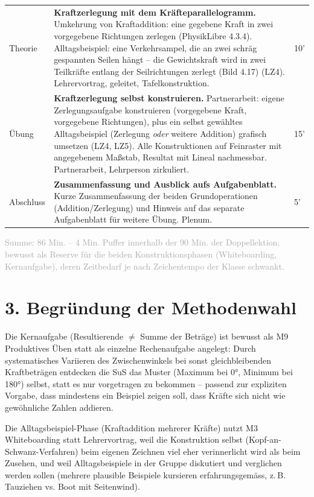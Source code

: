 \documentclass[11pt,a4paper]{article}
\begin{document}
\begin{xltabular}{\textwidth}{@{}p{2.6cm}X p{1.2cm}@{}}
Theorie &
\textbf{Kraftzerlegung mit dem Kräfteparallelogramm.} Umkehrung von
Kraftaddition: eine gegebene Kraft in zwei vorgegebene Richtungen
zerlegen (PhysikLibre 4.3.4). Alltagsbeispiel: eine Verkehrsampel, die an
zwei schräg gespannten Seilen hängt -- die Gewichtskraft wird in zwei
Teilkräfte entlang der Seilrichtungen zerlegt (Bild 4.17) (LZ4).
Lehrervortrag, geleitet, Tafelkonstruktion. &
10' \\[0.4em]

Übung &
\textbf{Kraftzerlegung selbst konstruieren.} Partnerarbeit: eigene
Zerlegungsaufgabe konstruieren (vorgegebene Kraft, vorgegebene Richtungen),
plus ein selbst gewähltes Alltagsbeispiel (Zerlegung \emph{oder} weitere
Addition) grafisch umsetzen (LZ4, LZ5). Alle Konstruktionen auf Feinraster
mit angegebenem Maßstab, Resultat mit Lineal nachmessbar. Partnerarbeit,
Lehrperson zirkuliert. &
15' \\[0.4em]

Abschluss &
\textbf{Zusammenfassung und Ausblick aufs Aufgabenblatt.} Kurze
Zusammenfassung der beiden Grundoperationen (Addition/Zerlegung) und
Hinweis auf das separate Aufgabenblatt für weitere Übung. Plenum. &
5' \\

\bottomrule
\end{xltabular}

\textcolor{darkgray}{\small Summe: 86 Min. -- 4 Min. Puffer innerhalb der
90 Min. der Doppellektion, bewusst als Reserve für die beiden
Konstruktionsphasen (Whiteboarding, Kernaufgabe), deren Zeitbedarf je nach
Zeichentempo der Klasse schwankt.}

\section*{3. Begründung der Methodenwahl}

Die Kernaufgabe (Resultierende $\neq$ Summe der Beträge) ist bewusst als
M9 Produktives Üben statt als einzelne Rechenaufgabe angelegt: Durch
systematisches Variieren des Zwischenwinkels bei sonst gleichbleibenden
Kraftbeträgen entdecken die SuS das Muster (Maximum bei 0°, Minimum bei
180°) selbst, statt es nur vorgetragen zu bekommen -- passend zur
expliziten Vorgabe, dass mindestens ein Beispiel zeigen soll, dass Kräfte
sich nicht wie gewöhnliche Zahlen addieren.

Die Alltagsbeispiel-Phase (Kraftaddition mehrerer Kräfte) nutzt M3
Whiteboarding statt Lehrervortrag, weil die Konstruktion selbst
(Kopf-an-Schwanz-Verfahren) beim eigenen Zeichnen viel eher verinnerlicht
wird als beim Zusehen, und weil Alltagsbeispiele in der Gruppe
diskutiert und verglichen werden sollen (mehrere plausible Beispiele
kursieren erfahrungsgemäss, z.\,B. Tauziehen vs. Boot mit Seitenwind).
\end{document}
